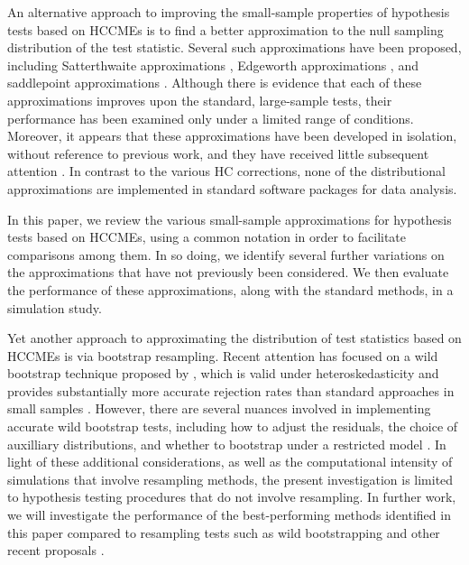 \documentclass[12pt]{article}\usepackage[]{graphicx}\usepackage[]{color}
\begin{document}
An alternative approach to improving the small-sample properties of hypothesis tests based on HCCMEs is to find a better approximation to the null sampling distribution of the test statistic. 
Several such approximations have been proposed, including Satterthwaite approximations \citep{Lipsitz1999degrees}, Edgeworth approximations \citep{Rothenberg1988approximate, Kauermann2001note}, and saddlepoint approximations \citep{McCaffrey2006improved}. 
Although there is evidence that each of these approximations improves upon the standard, large-sample tests, their performance has been examined only under a limited range of conditions. 
Moreover, it appears that these approximations have been developed in isolation, without reference to previous work, and they have received little subsequent attention \citep[e.g., none are discussed in a recent review by][]{MacKinnon2013thirty}. 
In contrast to the various HC corrections, none of the distributional approximations are implemented in standard software packages for data analysis. 

In this paper, we review the various small-sample approximations for hypothesis tests based on HCCMEs, using a common notation in order to facilitate comparisons among them. 
In so doing, we identify several further variations on the approximations that have not previously been considered. 
We then evaluate the performance of these approximations, along with the standard methods, in a simulation study. 

Yet another approach to approximating the distribution of test statistics based on HCCMEs is via bootstrap resampling. 
Recent attention has focused on a wild bootstrap technique proposed by \citet{Liu1988bootstrap}, which is valid under heteroskedasticity and provides substantially more accurate rejection rates than standard approaches in small samples \citep{Flachaire2005boostrapping, Davidson2008wild}. 
However, there are several nuances involved in implementing accurate wild bootstrap tests, including how to adjust the residuals, the choice of auxilliary distributions, and whether to bootstrap under a restricted model \citep{MacKinnon2013thirty}. 
In light of these additional considerations, as well as the computational intensity of simulations that involve resampling methods, the present investigation is limited to hypothesis testing procedures that do not involve resampling. 
In further work, we will investigate the performance of the best-performing methods identified in this paper compared to resampling tests such as wild bootstrapping and other recent proposals \citep[e.g.][]{Richard2016hetero}.
\end{document}
